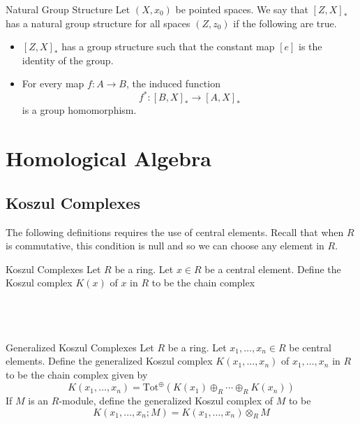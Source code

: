 \documentclass[a4paper]{article}
\begin{document}
\begin{defn}{Natural Group Structure}{} Let $(X,x_0)$ be pointed spaces. We say that $[Z,X]_\ast$ has a natural group structure for all spaces $(Z,z_0)$ if the following are true. 
\begin{itemize}
\item $[Z,X]_\ast$ has a group structure such that the constant map $[e]$ is the identity of the group. 
\item For every map $f:A\to B$, the induced function $$f^\ast:[B,X]_\ast\to[A,X]_\ast$$ is a group homomorphism. 
\end{itemize}
\end{defn}

\pagebreak
\section{Homological Algebra}
\subsection{Koszul Complexes}
The following definitions requires the use of central elements. Recall that when $R$ is commutative, this condition is null and so we can choose any element in $R$. 

\begin{defn}{Koszul Complexes}{} Let $R$ be a ring. Let $x\in R$ be a central element. Define the Koszul complex $K(x)$ of $x$ in $R$ to be the chain complex \\~\\
 \\~\\
\end{defn}

\begin{defn}{Generalized Koszul Complexes}{} Let $R$ be a ring. Let $x_1,\dots,x_n\in R$ be central elements. Define the generalized Koszul complex $K(x_1,\dots,x_n)$ of $x_1,\dots,x_n$ in $R$ to be the chain complex given by $$K(x_1,\dots,x_n)=\text{Tot}^\oplus\left(K(x_1)\oplus_R\cdots\oplus_R K(x_n)\right)$$ If $M$ is an $R$-module, define the generalized Koszul complex of $M$ to be $$K(x_1,\dots,x_n;M)=K(x_1,\dots,x_n)\otimes_R M$$
\end{defn}
\end{document}
